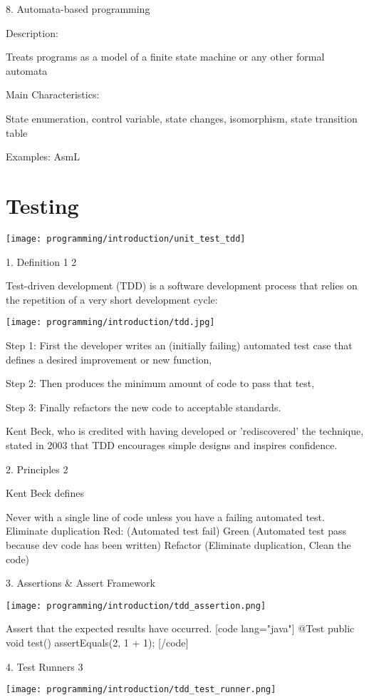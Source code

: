 8. Automata-based programming

Description:

Treats programs as a model of a finite state machine or any other formal automata

Main Characteristics:

State enumeration, control variable, state changes, isomorphism, state transition table

Examples: AsmL

\section{Testing}

\texttt{[image: programming/introduction/unit\_test\_tdd]}

1. Definition 1 2

Test-driven development (TDD) is a software development process that relies on the repetition of a very short development cycle:

\texttt{[image: programming/introduction/tdd.jpg]}

Step 1: First the developer writes an (initially failing) automated test case that defines a desired improvement or new function,

Step 2: Then produces the minimum amount of code to pass that test,

Step 3: Finally refactors the new code to acceptable standards.

Kent Beck, who is credited with having developed or 'rediscovered' the technique, stated in 2003 that TDD encourages simple designs and inspires confidence.

2. Principles 2

Kent Beck defines

Never with a single line of code unless you have a failing automated test.
Eliminate duplication
Red: (Automated test fail) Green (Automated test pass because dev code has been written) Refactor (Eliminate duplication, Clean the code)

3. Assertions & Assert Framework

\texttt{[image: programming/introduction/tdd\_assertion.png]}

Assert that the expected results have occurred.
[code lang="java"] @Test public void test() { assertEquals(2, 1 + 1); } [/code]


4. Test Runners 3

\texttt{[image: programming/introduction/tdd\_test\_runner.png]}

